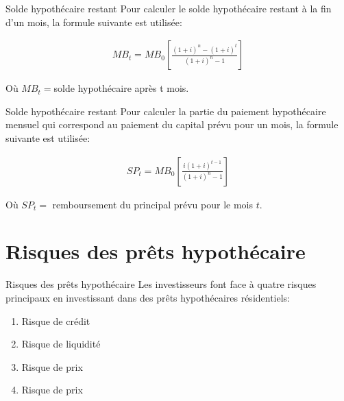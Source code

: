 \documentclass{beamer}
\begin{document}
\begin{frame}{Solde hypothécaire restant}
Pour calculer le solde hypothécaire restant à la fin d'un mois, la formule suivante est utilisée:

\vspace{0.5cm}

\begin{align*}
MB_t=MB_0 \left[ \frac{(1+i)^n-(1+i)^t}{(1+i)^n-1} \right]
\end{align*}

\vspace{0.5cm}

Où $MB_t=$solde hypothécaire après t mois.

\end{frame}

\begin{frame}{Solde hypothécaire restant}
Pour calculer la partie du paiement hypothécaire mensuel qui correspond au paiement du capital prévu pour un mois, la formule suivante est utilisée: 

\vspace{0.5cm}

\begin{align*}
SP_t=MB_0 \left[ \frac{i(1+i)^{t-1}}{(1+i)^n-1} \right]
\end{align*}

\vspace{0.5cm}
Où $SP_t=$ remboursement du principal prévu pour le mois $t$.

\end{frame}

\section{Risques des prêts hypothécaire}


\begin{frame}{Risques des prêts hypothécaire}
Les investisseurs font face à quatre risques principaux en investissant dans des prêts hypothécaires résidentiels: 
\begin{enumerate}[label=\arabic*)]
\item Risque de crédit
\item Risque de liquidité
\item Risque de prix 
\item Risque de prix 
\end{enumerate}
\end{frame}
\end{document}
